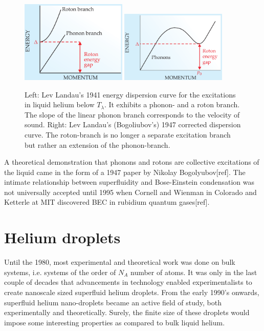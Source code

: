 \documentclass[11pt,a4paper,twoside]{article}
\begin{document}
		\begin{figure}[t]
			\begin{center}
				\includegraphics[width=0.45\textwidth]{phonon-roton-landau-first}
				\includegraphics[width=0.45\textwidth]{phonon-roton-bogoliubov}
			\end{center}
			\caption{Left: Lev Landau's 1941 energy dispersion curve for the excitations in liquid helium below $T_\lambda$. It exhibits a phonon- and a roton branch. The slope of the linear phonon branch corresponds to the velocity of sound. Right: Lev Landau's (Bogoliubov's) 1947 corrected dispersion curve. The roton-branch is no longer a separate excitation branch but rather an extension of the phonon-branch.}
			\label{fig:phonon-roton}
		\end{figure}

		A theoretical demonstration that phonons and rotons are collective excitations of the liquid came in the form of a 1947 paper by Nikolay Bogolyubov[ref]. The intimate relationship between superfluidity and Bose-Einstein condensation was not universally accepted until 1995 when Cornell and Wienman in Colorado and Ketterle at MIT discovered BEC in rubidium quantum gases[ref].
	
	\section{Helium droplets}
		Until the 1980, most experimental and theoretical work was done on bulk systems, i.e. systems of the order of $N_A$ number of atoms. It was only in the last couple of decades that advancements in technology enabled experimentalists to create nanoscale sized superfluid helium droplets. From the early 1990's onwards, superfluid helium nano-droplets became an active field of study, both experimentally and theoretically. Surely, the finite size of these droplets would impose some interesting properties as compared to bulk liquid helium.\\
		
\end{document}
